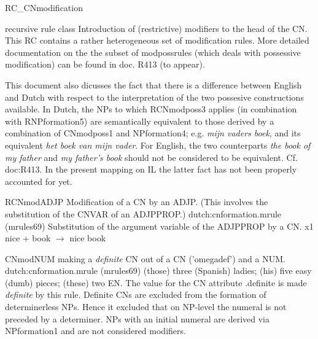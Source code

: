 \begin{mruleclass}{RC\_CNmodification}
\begin{classdescr}
\kind recursive rule class
\classtask Introduction of (restrictive) modifiers to the head of the CN.
\classremarks\mbox{}
This RC contains a rather heterogeneous set of modification rules. 
More detailed documentation on the the subset of modpossrules 
(which deals with possessive modification)
can be found in doc. R413 
(to appear).

This document also dicusses the fact that there is a difference between English 
and Dutch with respect to the interpretation of the two possesive constructions 
available.
In Dutch,
the NPs to which RCNmodposs3  applies (in combination with RNPformation5)
are semantically equivalent
to those derived by a combination of CNmodposs1 and NPformation4; e.g. 
{\em mijn vaders boek},  and its equivalent 
{\em het boek van mijn vader}.
For English, the two counterparts {\em the book of my father} and 
{\em my father's book} should not be considered to be equivalent. 
Cf. doc:R413.
In the present mapping on IL the latter fact 
has not been properly accounted for yet.
\nofilters

\nospeedrules

\noplannedrules

\norulesnotince


\end{classdescr}

\begin{members}


\begin{member}
 RCNmodADJP
 Modification of a CN by an ADJP. (This involves the 
substitution  of the CNVAR of an ADJPPROP.)
\file dutch:cnformation.mrule (mrules69)
\semantics Substitution of the argument variable of the
ADJPPROP by a CN.
\example x1 nice + book $\rightarrow$ nice book
\remarks\mbox{} 
\end{member}
\begin{member}
 CNmodNUM
 making a {\em definite} CN out of a CN ('omegadef') and a NUM.
\file dutch:cnformation.mrule (mrules69)
\semantics \nosemantics
\example (those) three  (Spanish) ladies; (his) five easy (dumb) pieces; 
(these) two EN.
\remarks\mbox{}
The value for the CN attribute .definite is made {\em definite} by 
this rule. Definite CNs are excluded from the formation of determinerless NPs.
Hence it excluded that on NP-level the numeral is not preceded by a determiner.
NPs with an initial numeral are derived via NPformation1 and are not
considered modifiers. 


\end{member}
\end{members}
\end{mruleclass}
